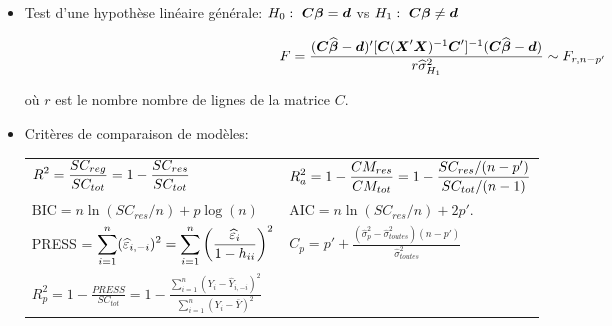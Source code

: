 \documentclass[a4paper, 11pt]{article}
\newcommand{\bm}{\boldmath}
\newcommand{\um}{\unboldmath}
\newcommand{\bobeta}{\mbox{$\boldsymbol\beta$}}
\newcommand{\bo}[1]{\mbox{\bm$#1$\um}}
\newcommand{\boX}{\mbox{$\boldsymbol{X}$}}
\newcommand{\hbobeta}{\widehat{\bobeta}}
\begin{document}
\begin{itemize}
\begin{equation*}\label{F:ESS}
F={SC_{res}^{(0)}-SC_{res}^{(1)}\over \Delta_{dl} \widehat{\sigma}^2_{H_1}}; \quad \mbox{ rejet de $H_0$ si  } F\ge F_{\Delta_{dl},n-p', 1-\alpha}
\end{equation*}

\medskip
où $SC_{res}^{(0)}$ = $SC_{res}$ du modèle réduit, $SC_{res}^{(1)}$ = $SC_{res}$ du modèle complet, 

\medskip
 $\Delta_{dl}=dl(SC_{res}^{(0)})-dl(SC_{res}^{(1)})$, et  $\widehat{\sigma}_{H_1}^2 = $ estimation de $\sigma^2$ avec le modèle complet. 

	\medskip\medskip\medskip\medskip
	\item[$\bullet$] Test d'une hypothèse linéaire générale: $H_0:~\bo{C}\bobeta=\bo{d}$ vs $H_1:~\bo{C}\bobeta \neq \bo{d}$
	
	\medskip
$$F={ (\bo{C}\hbobeta-\bo{d})'[\bo{C}(\boX'\boX)^{-1}\bo{C}']^{-1}(\bo{C}\hbobeta-\bo{d})\over r \widehat{\sigma}^2_{H_1}} \sim F_{r, n-p'}$$

\medskip
où $r$ est le nombre nombre de lignes de la matrice $C$.\\


\newpage

	\item[$\bullet$] Critères de comparaison de modèles:
	
	\begin{center}
		\begin{tabular}{ll}
     $\displaystyle R^2={SC_{reg}\over SC_{tot}}=1-{SC_{res}\over SC_{tot}}$
     & $\displaystyle R^2_{a}=1-{CM_{res}\over CM_{tot}}=1-{SC_{res}/(n-p')\over SC_{tot}/(n-1)}$\medskip\\\medskip
     
      $\displaystyle \mbox{BIC}=n\ln(SC_{res}/n)+ p \log(n)$
     & $\displaystyle \mbox{AIC}=n\ln(SC_{res}/n)+2p'.$\\ 
     PRESS = $\displaystyle \sum_{i=1}^n (\widehat{\varepsilon}_{i,-i})^2 = \sum_{i=1}^n\left({\widehat\varepsilon_i\over1-h_{ii}}\right)^2$
     & $\displaystyle  C_p = p' + \frac{(\widehat{\sigma}_p^2-\widehat{\sigma}_{toutes}^2)(n-p')}{\widehat{\sigma}_{toutes}^2} $ \medskip\\\medskip
    
	    $ \displaystyle R^2_{p}=1- \frac{PRESS}{SC_{tot}} = 1 - \frac{\sum\limits_{i=1}^n(Y_i-\widehat{Y}_{i,-i})^2}{\sum\limits_{i=1}^n(Y_i-\bar{Y})^2} $  &
\end{tabular}
\end{center}






\end{itemize}
\end{document}
